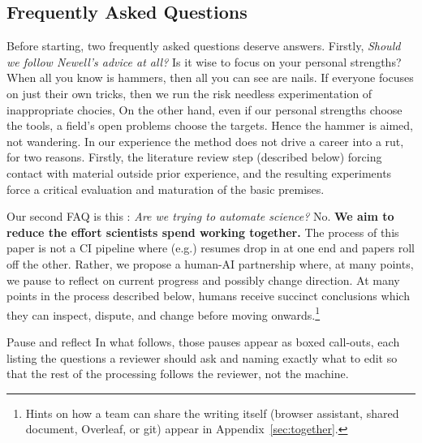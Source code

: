 

\subsection{Frequently Asked Questions}
Before starting, two frequently asked questions deserve answers.
Firstly, {\em Should we follow Newell's advice at all?}
Is it wise to focus on your personal strengths?
When all you know is hammers, then all you can see are nails.
If everyone focuses on just their own tricks, then we run the risk
needless experimentation of inappropriate chocies, On the other hand,
even if our personal strengths choose the tools, a field's open
problems choose the targets.
Hence the hammer is aimed, not wandering.
In our experience the method does not drive a career into a rut, for
two reasons.
Firstly, the literature review step (described below) forcing contact
with material outside prior experience, and the resulting experiments
force a critical evaluation and maturation of the basic premises.

Our second FAQ is this : {\em Are we trying to automate science?}
No. \textbf{We aim to reduce the effort scientists spend working
together.}
The process of this paper is not a CI pipeline where (e.g.) resumes
drop in at one end and papers roll off the other.
Rather, we propose a human-AI partnership where, at many points, we
pause to reflect on current progress and possibly change direction.
At many points in the process described below, humans receive succinct
conclusions which they can inspect, dispute, and change before moving
onwards.\footnote{Hints on how a team can share the writing itself
(browser assistant, shared document, Overleaf, or git) appear in
Appendix~\ref{sec:together}.}
\begin{pause}{Pause and reflect}
In what follows, those pauses appear as boxed call-outs, each listing
the questions a reviewer should ask and naming exactly what to edit so
that the rest of the processing follows the reviewer, not the machine.
\end{pause}

